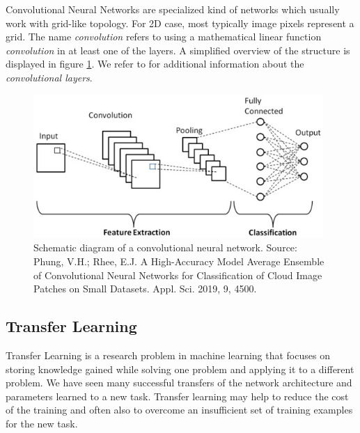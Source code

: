 Convolutional Neural Networks are specialized kind of networks which usually work with grid-like topology. For 2D case, most typically image pixels represent a grid. The name \emph{convolution} refers to using a mathematical linear function \emph{convolution} in at least one of the layers. A simplified overview of the structure is displayed in figure \ref{fig:convolution_neural_network}. We refer to \cite{Goodfellow-et-al-2016} for additional information about the \emph{convolutional layers}.

\begin{figure}
    \centering
    \includegraphics[width=0.98\textwidth]{img/convolution_neural_network.jpg}
    \caption{Schematic diagram of a convolutional neural network. Source: Phung, V.H.; Rhee, E.J. A High-Accuracy Model Average Ensemble of Convolutional Neural Networks for Classification of Cloud Image Patches on Small Datasets. Appl. Sci. 2019, 9, 4500.}
    \label{fig:convolution_neural_network}
\end{figure}


\subsection{Transfer Learning}

Transfer Learning is a research problem in machine learning that focuses on storing knowledge gained while solving one problem and applying it to a different problem. We have seen many successful transfers of the network architecture and parameters learned to a new task. Transfer learning may help to reduce the cost of the training and often also to overcome an insufficient set of training examples for the new task.

